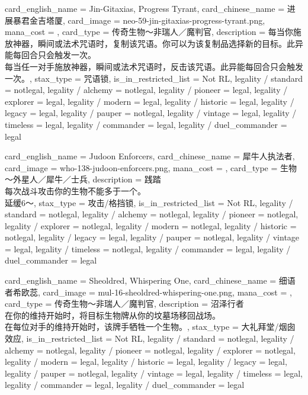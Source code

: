 \documentclass[lang = cn, color = black, 10pt]{AllThatStax}
\begin{document}
\card
{
	card_english_name = {Jin-Gitaxias, Progress Tyrant},
	card_chinese_name = {进展暴君金吉塔厦},
	card_image = neo-59-jin-gitaxias-progress-tyrant.png,
	mana_cost = ,
	card_type = 传奇生物～非瑞人／魔判官,
	description = {每当你施放神器，瞬间或法术咒语时，复制该咒语。你可以为该复制品选择新的目标。此异能每回合只会触发一次。\\
每当任一对手施放神器，瞬间或法术咒语时，反击该咒语。此异能每回合只会触发一次。},
	stax_type = 咒语锁,
	is_in_restricted_list = Not RL,
	legality / standard = notlegal,
	legality / alchemy = notlegal,
	legality / pioneer = legal,
	legality / explorer = legal,
	legality / modern = legal,
	legality / historic = legal,
	legality / legacy = legal,
	legality / pauper = notlegal,
	legality / vintage = legal,
	legality / timeless = legal,
	legality / commander = legal,
	legality / duel_commander = legal
}

\card
{
	card_english_name = {Judoon Enforcers},
	card_chinese_name = {犀牛人执法者},
	card_image = who-138-judoon-enforcers.png,
	mana_cost = ,
	card_type = 生物～外星人／犀牛／士兵,
	description = {践踏\\
每次战斗攻击你的生物不能多于一个。\\
延缓6～},
	stax_type = 攻击/格挡锁,
	is_in_restricted_list = Not RL,
	legality / standard = notlegal,
	legality / alchemy = notlegal,
	legality / pioneer = notlegal,
	legality / explorer = notlegal,
	legality / modern = notlegal,
	legality / historic = notlegal,
	legality / legacy = legal,
	legality / pauper = notlegal,
	legality / vintage = legal,
	legality / timeless = notlegal,
	legality / commander = legal,
	legality / duel_commander = legal
}

\card
{
	card_english_name = {Sheoldred, Whispering One},
	card_chinese_name = {细语者希欧蕊},
	card_image = mul-16-sheoldred-whispering-one.png,
	mana_cost = ,
	card_type = 传奇生物～非瑞人／魔判官,
	description = {沼泽行者\\
在你的维持开始时，将目标生物牌从你的坟墓场移回战场。\\
在每位对手的维持开始时，该牌手牺牲一个生物。},
	stax_type = 大礼拜堂/烟囱效应,
	is_in_restricted_list = Not RL,
	legality / standard = notlegal,
	legality / alchemy = notlegal,
	legality / pioneer = notlegal,
	legality / explorer = notlegal,
	legality / modern = legal,
	legality / historic = legal,
	legality / legacy = legal,
	legality / pauper = notlegal,
	legality / vintage = legal,
	legality / timeless = legal,
	legality / commander = legal,
	legality / duel_commander = legal
}
\end{document}
